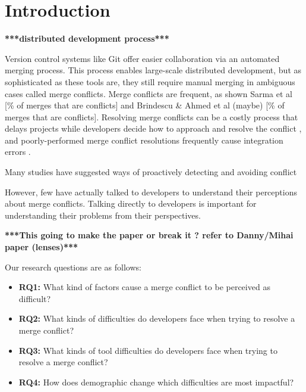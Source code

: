 \section{Introduction}
\textbf{***distributed development process***}



Version control systems like Git offer easier collaboration via an automated merging process. This process enables large-scale distributed development, but as sophisticated as these tools are, they still require manual merging in ambiguous cases called merge conflicts. Merge conflicts are frequent, as shown Sarma et al [\% of merges that are conflicts] and Brindescu \& Ahmed et al (maybe) [\% of merges that are conflicts]. Resolving merge conflicts can be a costly process that delays projects while developers decide how to approach and resolve the conflict \cite{cassandra}, and poorly-performed merge conflict resolutions frequently cause integration errors \cite{bird-branches-conflict}. 


Many studies have suggested ways of proactively detecting and avoiding conflict \cite{Brun2011} \cite{palantir} 


However, few have actually talked to developers to understand their perceptions about merge conflicts. Talking directly to developers is important for understanding their problems from their perspectives.

\textbf{***This going to make the paper or break it ? refer to Danny/Mihai paper (lenses)***}

Our research questions are as follows:
\begin{itemize}
\item\textbf{RQ1:} What kind of factors cause a merge conflict to be perceived as difficult?\\
\item\textbf{RQ2:} What kinds of difficulties do developers face when trying to resolve a merge conflict?\\
\item\textbf{RQ3:} What kinds of tool difficulties do developers face when trying to resolve a merge conflict?\\
\item\textbf{RQ4:} How does demographic change which difficulties are most impactful?\\
\end{itemize}